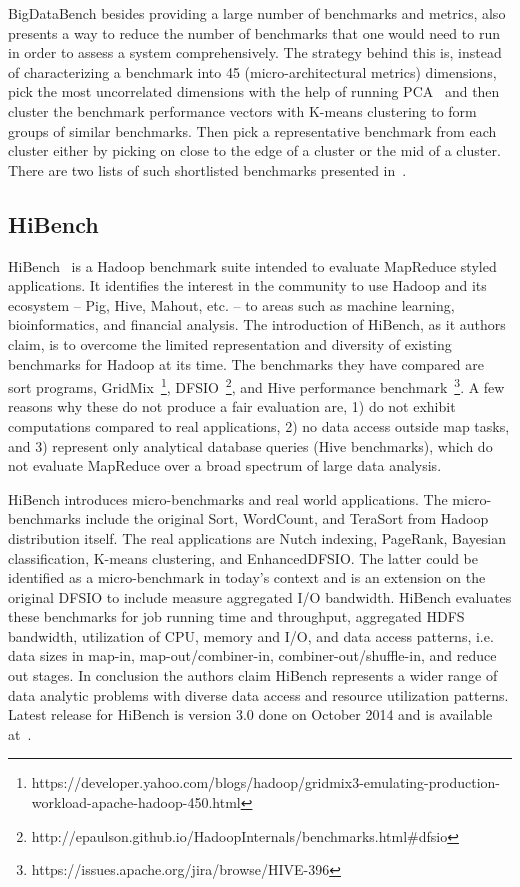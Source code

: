 BigDataBench besides providing a large number of benchmarks and metrics, also presents a way to reduce the number of benchmarks that one would need to run in order to assess a system comprehensively. The strategy behind this is, instead of characterizing a benchmark into 45 (micro-architectural metrics) dimensions, pick the most uncorrelated dimensions with the help of running \ac{PCA}~\cite{DBLP:journals/corr/WangZLZYHGJSZZLZLQ14} and then cluster the benchmark performance vectors with K-means clustering to form groups of similar benchmarks. Then pick a representative benchmark from each cluster either by picking on close to the edge of a cluster or the mid of a cluster. There are two lists of such shortlisted benchmarks presented in~\cite{handbookofbigdatabench}.

\subsection{HiBench}
HiBench~\cite{hibench} is a Hadoop benchmark suite intended to evaluate MapReduce styled applications. It identifies the interest in the community to use Hadoop and its ecosystem – Pig, Hive, Mahout, etc. – to areas such as machine learning, bioinformatics, and financial analysis. The introduction of HiBench, as it authors claim, is to overcome the limited representation and diversity of existing benchmarks for Hadoop at its time. The benchmarks they have compared are sort programs, GridMix~\footnote{https://developer.yahoo.com/blogs/hadoop/gridmix3-emulating-production-workload-apache-hadoop-450.html}, DFSIO~\footnote{http://epaulson.github.io/HadoopInternals/benchmarks.html\#dfsio}, and Hive performance benchmark~\footnote{https://issues.apache.org/jira/browse/HIVE-396}.  A few reasons why these do not produce a fair evaluation are, 1) do not exhibit computations compared to real applications, 2) no data access outside map tasks, and 3) represent only analytical database queries (Hive benchmarks), which do not evaluate MapReduce over a broad spectrum of large data analysis. 

HiBench introduces micro-benchmarks and real world applications. The micro-benchmarks include the original Sort, WordCount, and TeraSort from Hadoop distribution itself. The real applications are Nutch indexing, PageRank, Bayesian classification, K-means clustering, and EnhancedDFSIO. The latter could be identified as a micro-benchmark in today’s context and is an extension on the original DFSIO to include measure aggregated I/O bandwidth. HiBench evaluates these benchmarks for job running time and throughput, aggregated \ac{HDFS} bandwidth, utilization of CPU, memory and I/O, and data access patterns, i.e. data sizes in map-in, map-out/combiner-in, combiner-out/shuffle-in, and reduce out stages. In conclusion the authors claim HiBench represents a wider range of data analytic problems with diverse data access and resource utilization patterns. Latest release for HiBench is version 3.0 done on October 2014 and is available at~\cite{hibench.dbms}.

